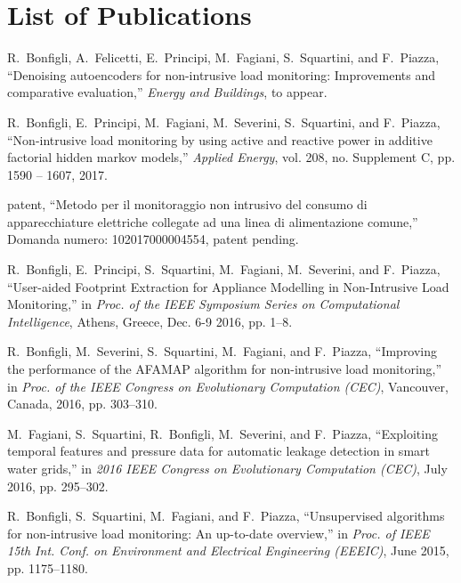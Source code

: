 \chapter*{List of Publications}
\pagestyle{plain}

\begin{list}{[]~}{}

\item
R.~Bonfigli, A.~Felicetti, E.~Principi, M.~Fagiani, S.~Squartini, and
  F.~Piazza, ``Denoising autoencoders for non-intrusive load monitoring:
  Improvements and comparative evaluation,'' \emph{Energy and Buildings}, to appear.

\item
R.~Bonfigli, E.~Principi, M.~Fagiani, M.~Severini, S.~Squartini, and
  F.~Piazza, ``Non-intrusive load monitoring by using active and reactive power
  in additive factorial hidden markov models,'' \emph{Applied Energy}, vol.
  208, no. Supplement C, pp. 1590 -- 1607, 2017.
  
\item  %
patent, ``Metodo per il monitoraggio non intrusivo del consumo di apparecchiature
elettriche collegate ad una linea di alimentazione comune,'' Domanda numero:
102017000004554, patent pending.

\item
R.~Bonfigli, E.~Principi, S.~Squartini, M.~Fagiani, M.~Severini, and
  F.~Piazza, ``{User-aided Footprint Extraction for Appliance Modelling in
  Non-Intrusive Load Monitoring},'' in \emph{Proc. of the IEEE Symposium Series
  on Computational Intelligence}, Athens, Greece, Dec. 6-9 2016, pp. 1--8.

\item
R.~Bonfigli, M.~Severini, S.~Squartini, M.~Fagiani, and F.~Piazza,
  ``Improving the performance of the {AFAMAP} algorithm for non-intrusive load
  monitoring,'' in \emph{Proc. of the IEEE Congress on Evolutionary Computation
  (CEC)}, Vancouver, Canada, 2016, pp. 303--310.

\item
M.~Fagiani, S.~Squartini, R.~Bonfigli, M.~Severini, and F.~Piazza,
  ``Exploiting temporal features and pressure data for automatic leakage
  detection in smart water grids,'' in \emph{2016 IEEE Congress on Evolutionary
  Computation (CEC)}, July 2016, pp. 295--302.

\item
R.~Bonfigli, S.~Squartini, M.~Fagiani, and F.~Piazza, ``Unsupervised
  algorithms for non-intrusive load monitoring: An up-to-date overview,'' in
  \emph{Proc. of IEEE 15th Int. Conf. on Environment and Electrical Engineering
  (EEEIC)}, June 2015, pp. 1175--1180.


\end{list}
